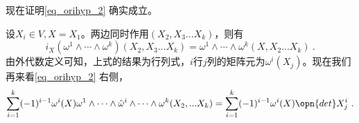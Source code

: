 现在证明\autoref{eq_orihyp_2} 确实成立。

设$X_i\in V,X=X_1$。两边同时作用$(X_2,X_3...X_k)$，则有
\begin{equation}
i_X(\omega^1\wedge\cdots\wedge\omega^k)(X_2,X_3...X_k)=\omega^1\wedge\cdots\wedge\omega^k(X,X_2...X_k)~.
\end{equation}
由外代数定义可知，上式的结果为行列式，$i$行$j$列的矩阵元为$\omega^i(X_j)$。现在我们再来看\autoref{eq_orihyp_2} 右侧，
\begin{equation}
\begin{aligned}
\sum_{i=1}^k(-1)^{i-1} \omega^i(X) \omega^1 \wedge \cdots \wedge \hat{\omega}^i \wedge \cdots \wedge \omega^k(X_2,...X_k)=\sum_{i=1}^k(-1)^{i-1} \omega^i(X) \opn{det}X^i_j~.
\end{aligned}
\end{equation}
